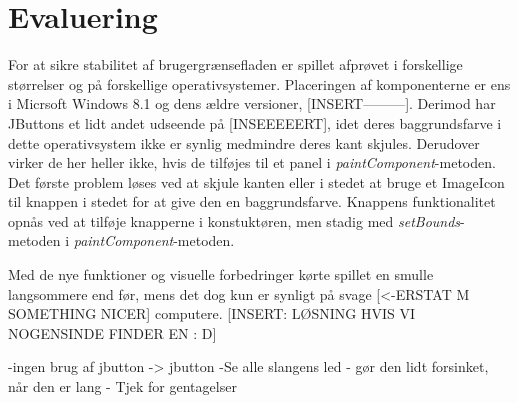 
\section{Evaluering}
For at sikre stabilitet af brugergrænsefladen er spillet afprøvet i forskellige størrelser og på forskellige operativsystemer. Placeringen af komponenterne er ens i Micrsoft Windows 8.1 og dens ældre versioner, [INSERT---------]. Derimod har JButtons et lidt andet udseende på [INSEEEEERT], idet deres baggrundsfarve i dette operativsystem ikke er synlig medmindre deres kant skjules. Derudover virker de her heller ikke, hvis de tilføjes til et panel i \textit{paintComponent}-metoden. Det første problem løses ved at skjule kanten eller i stedet at bruge et ImageIcon til knappen i stedet for at give den en baggrundsfarve. Knappens funktionalitet opnås ved at tilføje knapperne i konstuktøren, men stadig med \textit{setBounds}-metoden i \textit{paintComponent}-metoden. 

Med de nye funktioner og visuelle forbedringer kørte spillet en smulle langsommere end før, mens det dog kun er synligt på svage [<-ERSTAT M SOMETHING NICER] computere. [INSERT: LØSNING HVIS VI NOGENSINDE FINDER EN : D]

-ingen brug af jbutton -> jbutton
-Se alle slangens led - gør den lidt forsinket, når den er lang
- Tjek for gentagelser
